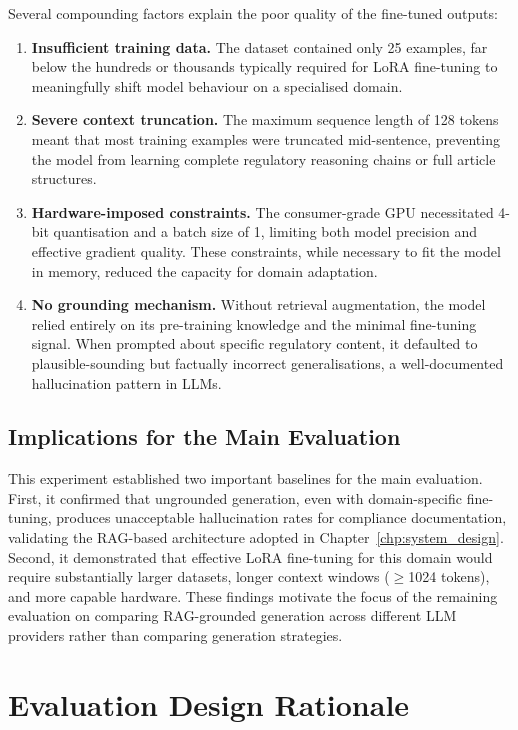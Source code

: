 \documentclass[]{UCD_CS_FYP_Report}
\begin{document}
Several compounding factors explain the poor quality of the fine-tuned outputs:

\begin{enumerate}
    \item \textbf{Insufficient training data.} The dataset contained only 25 examples, far below the hundreds or thousands typically required for LoRA fine-tuning to meaningfully shift model behaviour on a specialised domain.
    \item \textbf{Severe context truncation.} The maximum sequence length of 128 tokens meant that most training examples were truncated mid-sentence, preventing the model from learning complete regulatory reasoning chains or full article structures.
    \item \textbf{Hardware-imposed constraints.} The consumer-grade GPU necessitated 4-bit quantisation and a batch size of 1, limiting both model precision and effective gradient quality. These constraints, while necessary to fit the model in memory, reduced the capacity for domain adaptation.
    \item \textbf{No grounding mechanism.} Without retrieval augmentation, the model relied entirely on its pre-training knowledge and the minimal fine-tuning signal. When prompted about specific regulatory content, it defaulted to plausible-sounding but factually incorrect generalisations, a well-documented hallucination pattern in LLMs.
\end{enumerate}

\subsection{Implications for the Main Evaluation}

This experiment established two important baselines for the main evaluation. First, it confirmed that ungrounded generation, even with domain-specific fine-tuning, produces unacceptable hallucination rates for compliance documentation, validating the RAG-based architecture adopted in Chapter~\ref{chp:system_design}. Second, it demonstrated that effective LoRA fine-tuning for this domain would require substantially larger datasets, longer context windows ($\geq$1024 tokens), and more capable hardware. These findings motivate the focus of the remaining evaluation on comparing RAG-grounded generation across different LLM providers rather than comparing generation strategies.

\section{Evaluation Design Rationale}
\label{sec:eval_design_rationale}
\end{document}
